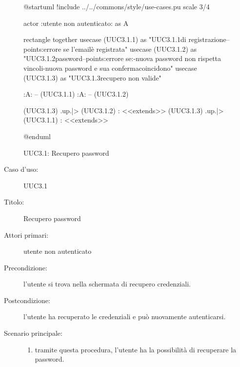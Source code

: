 \documentclass[../analisi-dei-requisiti.tex]{subfiles}
\begin{document}
\begin{figure}[h!]
  \centering
  \begin{plantuml}
  @startuml
  !include ../../commons/style/use-cases.pu
  scale 3/4

  actor :utente non autenticato: as A

  rectangle {
    together {
      usecase (UUC3.1.1) as "UUC3.1.1\nInserimento\nemail di registrazione\n--\nExtension points:\nVisualizzazione errore se l'email\nnon è registrata"
      usecase (UUC3.1.2) as "UUC3.1.2\nReimpostazione password\n--\nExtension points:\nVisualizzazione errore se:\n-nuova password non rispetta vincoli\n-nuova password e sua conferma\nnon coincidono"
      usecase (UUC3.1.3) as "UUC3.1.3\nInformazioni recupero non valide"
    }
  }

  :A: -- (UUC3.1.1)
  :A: -- (UUC3.1.2)

  (UUC3.1.3) .up.|> (UUC3.1.2) : <<extends>>
  (UUC3.1.3) .up.|> (UUC3.1.1) : <<extends>>

  @enduml
  \end{plantuml}
  \caption{UUC3.1: Recupero password}
  \label{fig:uuc3_1}
\end{figure}

\begin{description}
  \item[Caso d’uso:] UUC3.1
  \item[Titolo:] Recupero password
  \item[Attori primari:] utente non autenticato
  \item[Precondizione:] l'utente si trova nella schermata di recupero credenziali.
  \item[Postcondizione:] l'utente ha recuperato le credenziali e può nuovamente autenticarsi.
  \item[Scenario principale:]
        \begin{enumerate}
          \item tramite questa procedura, l'utente ha la possibilità di recuperare la password.
        \end{enumerate}
\end{description}

\end{document}
